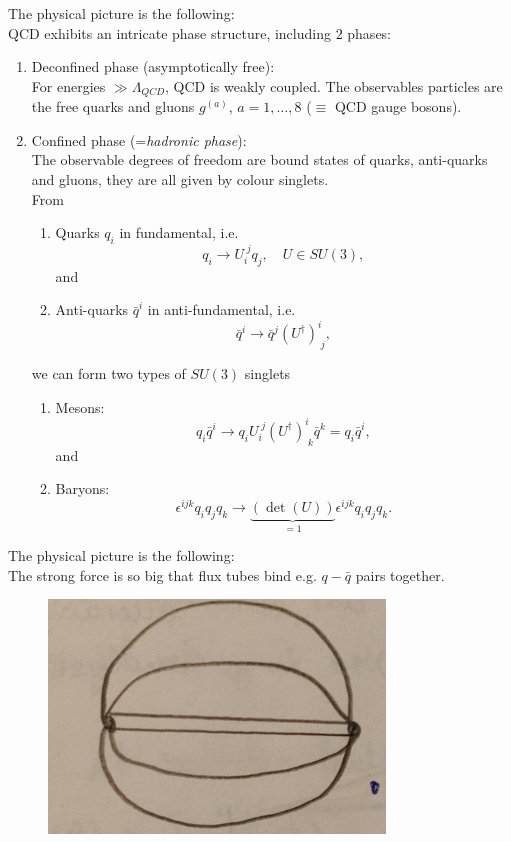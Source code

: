 The physical picture is the following:\\
QCD exhibits an intricate phase structure, including $2$ phases:
\begin{enumerate}
	\item Deconfined phase (asymptotically free):\\
	For energies $\gg \Lambda_{QCD}$, QCD is weakly coupled. The observables particles are the free quarks and gluons $g^{(a)}$, $a=1,\dots,8$ ($\equiv$ QCD gauge bosons).
	\item Confined phase (=\emph{hadronic phase}):\\
	The observable degrees of freedom are bound states of quarks, anti-quarks and gluons, they are all given by colour singlets.\\
	From
	\begin{enumerate}
		\item Quarks $q_i$ in fundamental, i.e.
		\begin{equation}
		q_i \rightarrow U^{\;j}_i q_j,\quad U\in SU(3),
		\end{equation}
		and
		\item Anti-quarks $\bar{q}^i$ in anti-fundamental, i.e.
		\begin{equation}
		\bar{q}^i \rightarrow \bar{q}^j (U^\dagger)^i_{\;j},
		\end{equation}
	\end{enumerate}
	we can form two types of $SU(3)$ singlets
	\begin{enumerate}
		\item Mesons:
		\begin{equation}
		q_i \bar{ q}^i \rightarrow q_i U^{\;j}_i (U^\dagger)^i_{\;k} \bar{q}^k = q_i \bar{q}^i,
		\end{equation}
		and
		\item Baryons:
		\begin{equation}
		\epsilon^{ijk} q_i q_j q_k \rightarrow \underbrace{(\det(U))}_{=1} \epsilon^{ijk} q_i q_j q_k.
		\end{equation}
	\end{enumerate}
\end{enumerate}
The physical picture is the following:\\
The strong force is so big that flux tubes bind e.g. $q-\bar{q}$ pairs together.



\begin{figure}[h!]
	\centering
	\includegraphics[width=0.7\linewidth]{gfx/YMpictures/GlueTunnel}
	\caption{}
	\label{fig:gluetunnel}
\end{figure}

